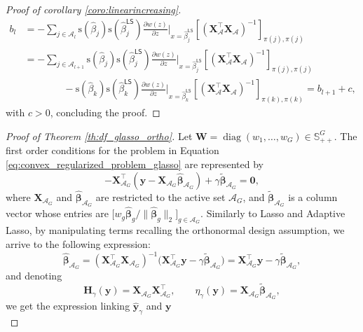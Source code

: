 \documentclass[a4paper, 12pt]{article}
\newcommand{\Aset}{\mathcal{A}}
\newcommand{\sgn}{\mathrm{s}}
\newcommand{\betahat}{\widehat{\boldsymbol\beta}}
\DeclareMathOperator{\diag}{diag}
\newcommand{\T}{\top}
\def\bbeta{\boldsymbol{\beta}}
\def\by{\boldsymbol{y}}
\def\bH{\mathbf{H}}
\def\bW{\mathbf{W}}
\def\bX{\mathbf{X}}
\def\by{\mathbf{y}}
\begin{document}
\begin{appendix}
\begin{proof}[Proof of corollary \ref{coro:linearincreasing}]
\begin{align*}
b_{l} &= -\sum_{j \in \Aset_l} \sgn({\widehat{\beta}_j})\sgn({\widehat{\beta}_j^\mathsf{LS}})\frac{\partial w(z)}{\partial z}\bigg|_{x=\widehat{\beta}_j^\mathsf{LS}}[(\bX_{\Aset}^{\T} \bX_{\Aset} )^{-1}]_{\pi(j),\pi(j)}\\
&=-\sum_{j \in \Aset_{l+1}} \sgn({\widehat{\beta}_j})\sgn({\widehat{\beta}_j^\mathsf{LS}})\frac{\partial w(z)}{\partial z}\bigg|_{x=\widehat{\beta}_j^\mathsf{LS}}[(\bX_{\Aset}^{\T} \bX_{\Aset} )^{-1}]_{\pi(j),\pi(j)}\nonumber\\
&\qquad\qquad-\sgn({\widehat{\beta}_k})\sgn({\widehat{\beta}_k^\mathsf{LS}})\frac{\partial w(z)}{\partial z}\bigg|_{x=\widehat{\beta}_k^\mathsf{LS}}[(\bX_{\Aset}^{\T} \bX_{\Aset} )^{-1}]_{\pi(k),\pi(k)}= b_{l+1} + c, 
\end{align*}
with $c>0$, concluding the proof.
\end{proof}
%
\begin{proof}[Proof of Theorem \ref{th:df_glasso_ortho}]
Let $\bW=\diag(w_1,\dots,w_G)\in\mathbb{S}^G_{++}$. The first order conditions for the problem in Equation \eqref{eq:convex_regularized_problem_glasso} are represented by
\begin{equation*}
-\bX_{\Aset_G}^{\T}(\by-\bX_{\Aset_G}\betahat_{\Aset_G})+\gamma\widetilde{\bbeta}_{\Aset_G}=\boldsymbol{0},
\end{equation*}
where $\bX_{\Aset_G}$ and $\widehat{\bbeta}_{\Aset_G}$ are restricted to the active set $\Aset_G$, and $\widetilde{\bbeta}_{\Aset_G}$ is a column vector whose entries are $ \Big[w_g\widehat{\bbeta}_g / \lVert \widehat{\bbeta}_g \rVert_2\Big]_{g\in\Aset_G}$. Similarly to Lasso and Adaptive Lasso, by manipulating terms recalling the orthonormal design assumption, we arrive to the following expression:
\begin{equation*}
\betahat_{\Aset_G} = (\bX_{\Aset_G}^{{\T}} \bX_{\Aset_G})^{-1} \big(\bX_{\Aset_G}^{\T} \by - \gamma\widetilde{\bbeta}_{\Aset_G} \big) = \bX_{\Aset_G}^{\T} \by - \gamma\widetilde{\bbeta}_{\Aset_G},
\end{equation*}
and denoting
\begin{equation*}
\label{eq:dof_glasso_definitions}
\bH_\gamma(\by)=\bX_{\Aset_G}\bX_{\Aset_G}^{\T},\qquad
\eta_\gamma(\by)=\bX_{\Aset_G}\widetilde{\bbeta}_{\Aset_G},
\end{equation*}
we get the expression linking $\widehat{\by}_\gamma$ and $\by$
\begin{equation*}

\end{equation*}
\end{proof}
\end{appendix}
\end{document}
